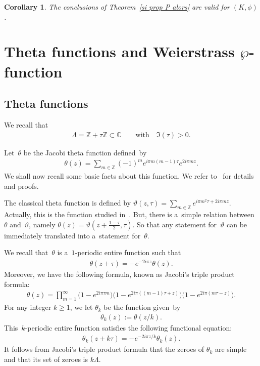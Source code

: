 \documentclass[10pt,a4paper]{amsart}
\numberwithin{equation}{section}
\newtheorem{Corollary}[Theorem]{Corollary}
\begin{document}
\begin{Corollary}
\label{coro1}
The conclusions of Theorem~{\rm \ref{si prop P alors}} are valid for $(K,\phi)$.
\end{Corollary}

\section[Theta functions and Weierstrass $\wp$-function]{Theta functions and Weierstrass $\boldsymbol{\wp}$-function}
\label{sec3}

\subsection{Theta functions}
\label{sec31}

We recall that
\begin{gather*}
\Lambda=\mathbb Z+\tau \mathbb Z \subset \mathbb C \qquad \text{with} \quad \Im(\tau)>0.
\end{gather*}

Let~$\theta$ be the Jacobi theta function def\/ined~by
\begin{gather*}
\theta(z)=\sum\limits_{m\in \mathbb Z}(-1)^{m} e^{i\pi m(m-1) \tau} e^{2i \pi m z}.
\end{gather*}
We shall now recall some basic facts about this function.
We refer to~\cite[Chapter~I]{Mumford} for details and proofs.



\begin{Remark}
The classical theta function is def\/ined by ${\vartheta(z,\tau) = \sum\limits_{m \in \mathbb Z} e^{i\pi m^{2} \tau+ 2i
\pi m z}}$.
Actually, this is the function studied in~\cite[Chapter~I]{Mumford}.
But, there is a~simple relation between~$\theta$ and~$\vartheta$, namely $\theta(z)=\vartheta(z+\frac{1-\tau}{2},\tau)$.
So that any statement for~$\vartheta$ can be immediately translated into a~statement for~$\theta$.
\end{Remark}

We recall that~$\theta$ is a~$1$-periodic entire function such that
\begin{gather*}
\theta(z+\tau)=- e^{-2i\pi z}\theta(z).
\end{gather*}
Moreover, we have the following formula, known as Jacobi's triple product formula:
\begin{gather*}
\theta(z)= \prod\limits_{m=1}^{\infty}\big(1-e^{2i\pi \tau
m}\big)\big(1-e^{2i\pi((m-1)\tau+z)}\big)\big(1-e^{2i\pi(m\tau-z)}\big).
\end{gather*}
For any integer $k \geq 1$, we let $\theta_{k}$ be the function given~by
\begin{gather*}
\theta_{k}(z):=\theta(z/k).
\end{gather*}
This~$k$-periodic entire function satisf\/ies the following functional equation:
\begin{gather}
\label{func equa theta k}
\theta_{k}(z+k\tau)=- e^{-2i\pi z/k}\theta_{k}(z).
\end{gather}
It follows from Jacobi's triple product formula that the zeroes of $\theta_{k}$ are simple and that its set of zeroes is
$k\Lambda$.
\end{document}

